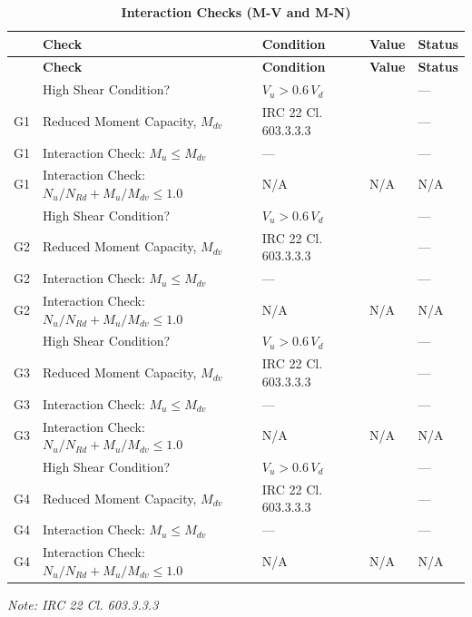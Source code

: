 \documentclass[12pt,a4paper]{report}
\numberwithin{table}{chapter}
\numberwithin{figure}{chapter}
\newcommand{\ReportTableGap}{\vspace{1em}}
\begin{document}
\ReportTableGap
\begin{longtable}{|C{2.5cm}|C{3.5cm}|C{3.5cm}|>{\centering\arraybackslash}p{4.2cm}|C{1.8cm}|}
\caption{\textbf{Interaction Checks (M-V and M-N)}}\\
\hline
\textbf{} & \textbf{Check} & \textbf{Condition} & \textbf{Value} & \textbf{Status} \\[6pt]
\hline
\endfirsthead
\hline
\textbf{} & \textbf{Check} & \textbf{Condition} & \textbf{Value} & \textbf{Status} \\[6pt]
\hline
\endhead

 & High Shear Condition? & $V_u > 0.6\,V_d$ &  & --- \\[6pt]
G1 & Reduced Moment Capacity, $M_{dv}$ & IRC 22 Cl. 603.3.3.3 &  & --- \\[6pt]
G1 & Interaction Check: $M_u \leq M_{dv}$ & --- &  & --- \\[6pt]
G1 & Interaction Check: $N_u/N_{Rd} + M_u/M_{dv} \leq 1.0$ & N/A & N/A & N/A \\[6pt]
\hline
{} & High Shear Condition? & $V_u > 0.6\,V_d$ &  & --- \\[6pt]
G2 & Reduced Moment Capacity, $M_{dv}$ & IRC 22 Cl. 603.3.3.3 &  & --- \\[6pt]
G2 & Interaction Check: $M_u \leq M_{dv}$ & --- &  & --- \\[6pt]
G2 & Interaction Check: $N_u/N_{Rd} + M_u/M_{dv} \leq 1.0$ & N/A & N/A & N/A \\[6pt]
\hline
{} & High Shear Condition? & $V_u > 0.6\,V_d$ &  & --- \\[6pt]
G3 & Reduced Moment Capacity, $M_{dv}$ & IRC 22 Cl. 603.3.3.3 &  & --- \\[6pt]
G3 & Interaction Check: $M_u \leq M_{dv}$ & --- &  & --- \\[6pt]
G3 & Interaction Check: $N_u/N_{Rd} + M_u/M_{dv} \leq 1.0$ & N/A & N/A & N/A \\[6pt]
\hline
{} & High Shear Condition? & $V_u > 0.6\,V_d$ &  & --- \\[6pt]
G4 & Reduced Moment Capacity, $M_{dv}$ & IRC 22 Cl. 603.3.3.3 &  & --- \\[6pt]
G4 & Interaction Check: $M_u \leq M_{dv}$ & --- &  & --- \\[6pt]
G4 & Interaction Check: $N_u/N_{Rd} + M_u/M_{dv} \leq 1.0$ & N/A & N/A & N/A \\[6pt]
\hline
\end{longtable}
\noindent\textit{Note: IRC 22 Cl. 603.3.3.3}
\end{document}
